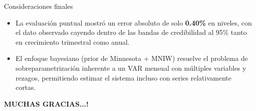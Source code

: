 \documentclass{beamer}
\begin{document}
\begin{frame}{Consideraciones finales}{}
\begin{itemize}\justifying
    \item La evaluación puntual mostró un error absoluto de solo \textbf{0.40\%} en niveles, con el dato observado cayendo dentro de las bandas de credibilidad al 95\% tanto en crecimiento trimestral como anual. \pause
    \item El enfoque bayesiano (prior de Minnesota + MNIW) resuelve el problema de sobreparametrización inherente a un VAR mensual con múltiples variables y rezagos, permitiendo estimar el sistema incluso con series relativamente cortas.
\end{itemize}
\end{frame}

\begin{frame}{}\justifying
\begin{block}{}
\begin{center}
\huge{\textbf{MUCHAS GRACIAS...!}}
\end{center}
\end{block}
\end{frame}
\end{document}
